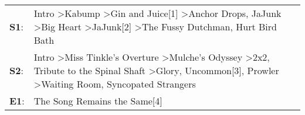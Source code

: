 \begin{supertabular}{p{0.03\textwidth}p{0.92\textwidth}}
 \textbf{S1}:  &                                                    Intro\textsuperscript{} \textgreater \enspace Kabump\textsuperscript{} \textgreater \enspace Gin and Juice[1]\textsuperscript{} \textgreater \enspace Anchor Drops\textsuperscript{}, \enspace JaJunk\textsuperscript{} \textgreater \enspace Big Heart\textsuperscript{} \textgreater \enspace JaJunk[2]\textsuperscript{} \textgreater \enspace The Fussy Dutchman\textsuperscript{}, \enspace Hurt Bird Bath\textsuperscript{}  \enspace  \\
 \textbf{S2}:  &  Intro\textsuperscript{} \textgreater \enspace Miss Tinkle's Overture\textsuperscript{} \textgreater \enspace Mulche's Odyssey\textsuperscript{} \textgreater \enspace 2x2\textsuperscript{}, \enspace Tribute to the Spinal Shaft\textsuperscript{} \textgreater \enspace Glory\textsuperscript{}, \enspace Uncommon[3]\textsuperscript{}, \enspace Prowler\textsuperscript{} \textgreater \enspace Waiting Room\textsuperscript{}, \enspace Syncopated Strangers\textsuperscript{}  \enspace  \\
 \textbf{E1}:  &                                                                                                                                                                                                                                                                                                                                                                                                                                       The Song Remains the Same[4]\textsuperscript{}  \enspace  \\
\end{supertabular}
